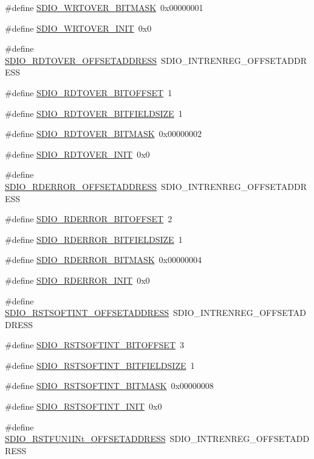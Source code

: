 \begin{DoxyCompactItemize}
\item 
\#define \hyperlink{a00571_ab1aa2ce8a82f3e2042cc8dcb4bfbc29a}{SDIO\_\-WRTOVER\_\-BITMASK}~0x00000001
\item 
\#define \hyperlink{a00571_a534c6f8f156767d2bcbb1cb753191ac8}{SDIO\_\-WRTOVER\_\-INIT}~0x0
\item 
\#define \hyperlink{a00571_a73d7df586f8aab8850d5d9ab7c4470c7}{SDIO\_\-RDTOVER\_\-OFFSETADDRESS}~SDIO\_\-INTRENREG\_\-OFFSETADDRESS
\item 
\#define \hyperlink{a00571_a89726e861a347a184d20982bdf4484e3}{SDIO\_\-RDTOVER\_\-BITOFFSET}~1
\item 
\#define \hyperlink{a00571_a56361d6a599dbf0fbfb36d98e3b2fb20}{SDIO\_\-RDTOVER\_\-BITFIELDSIZE}~1
\item 
\#define \hyperlink{a00571_ad9ada51601a79139158d5f7690c15e4f}{SDIO\_\-RDTOVER\_\-BITMASK}~0x00000002
\item 
\#define \hyperlink{a00571_aaba0efe5e837ba9b3f4ec3b58a278754}{SDIO\_\-RDTOVER\_\-INIT}~0x0
\item 
\#define \hyperlink{a00571_a79bb6e96d4a04313587b0eda4b4518e3}{SDIO\_\-RDERROR\_\-OFFSETADDRESS}~SDIO\_\-INTRENREG\_\-OFFSETADDRESS
\item 
\#define \hyperlink{a00571_aa7b5462d2a31b319c87b1df023281f91}{SDIO\_\-RDERROR\_\-BITOFFSET}~2
\item 
\#define \hyperlink{a00571_afa6efbd0fd9485ff2f5287816d165018}{SDIO\_\-RDERROR\_\-BITFIELDSIZE}~1
\item 
\#define \hyperlink{a00571_a911fbd846c95587f94b5bf9f966b0512}{SDIO\_\-RDERROR\_\-BITMASK}~0x00000004
\item 
\#define \hyperlink{a00571_a68d178cd1daa83cdc41b52bd9c3beead}{SDIO\_\-RDERROR\_\-INIT}~0x0
\item 
\#define \hyperlink{a00571_a3e27778bd9ffdbb8a1b6d7119192afca}{SDIO\_\-RSTSOFTINT\_\-OFFSETADDRESS}~SDIO\_\-INTRENREG\_\-OFFSETADDRESS
\item 
\#define \hyperlink{a00571_ad42bbcfcb0df47387379937ff74adc3f}{SDIO\_\-RSTSOFTINT\_\-BITOFFSET}~3
\item 
\#define \hyperlink{a00571_a8853f6cb3e4cd7b46e14f7a1961a2cd0}{SDIO\_\-RSTSOFTINT\_\-BITFIELDSIZE}~1
\item 
\#define \hyperlink{a00571_ac72a044536057b99ba821e3328ce5bda}{SDIO\_\-RSTSOFTINT\_\-BITMASK}~0x00000008
\item 
\#define \hyperlink{a00571_aa1744d98c176df7b2d15fd9cf8220ec8}{SDIO\_\-RSTSOFTINT\_\-INIT}~0x0
\item 
\#define \hyperlink{a00571_ad44ca5bb1175c98a3a9f86d5154682e0}{SDIO\_\-RSTFUN1INt\_\-OFFSETADDRESS}~SDIO\_\-INTRENREG\_\-OFFSETADDRESS

\end{DoxyCompactItemize}

